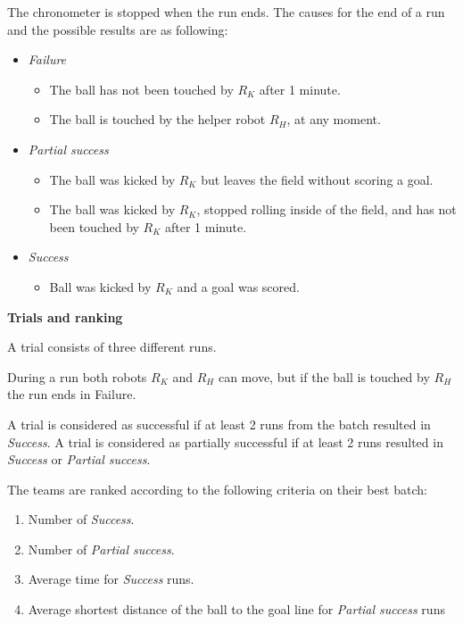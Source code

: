The chronometer is stopped when the run ends. The causes for the end of a run and
the possible results are as following:
\begin{itemize}
\item \textit{Failure}
  \begin{itemize}
    \item The ball has not been touched by $R_K$ after 1 minute. 
     \item The ball is touched by the helper robot $R_H$, at any moment. 
  \end{itemize}
\item \textit{Partial success}
  \begin{itemize}
    \item The ball was kicked by $R_K$ but leaves the field without scoring a goal.
    \item The ball was kicked by $R_K$, stopped rolling inside of the field, and has not been touched by $R_K$ after 1 minute.
  \end{itemize}
\item \textit{Success}
  \begin{itemize}
    \item Ball was kicked by $R_K$ and a goal was scored.
  \end{itemize}
\end{itemize}

{\bfseries Trials and ranking}

A trial consists of three different runs. 

During a run both robots $R_K$ and $R_H$ can move, but if the ball is touched by $R_H$ the run ends in Failure.

A trial is considered as successful if at least 2
runs from the batch resulted in \textit{Success}. A trial is considered as
partially successful if at least 2 runs resulted in \textit{Success} or \textit{Partial success}.

The teams are ranked according to the following criteria on their best batch:
\begin{enumerate}
\item Number of \textit{Success}.
\item Number of \textit{Partial success}.
\item Average time for \textit{Success} runs.
\item Average shortest distance of the ball to the goal line for \textit{Partial success} runs
\end{enumerate}
